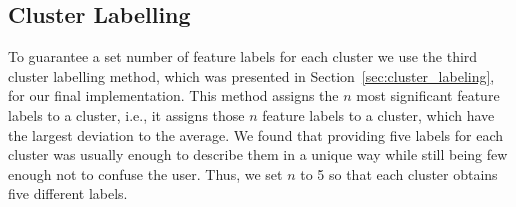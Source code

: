 \subsection{Cluster Labelling}
\label{sec:impl_cluster_labeling}

To guarantee a set number of feature labels for each cluster we use the third cluster labelling method, which was presented in Section~\ref{sec:cluster_labeling}, for our final implementation.
This method assigns the $n$ most significant feature labels to a cluster, i.e., it assigns those $n$ feature labels to a cluster, which have the largest deviation to the average.
We found that providing five labels for each cluster was usually enough to describe them in a unique way while still being few enough not to confuse the user.
Thus, we set $n$ to 5 so that each cluster obtains five different labels.
